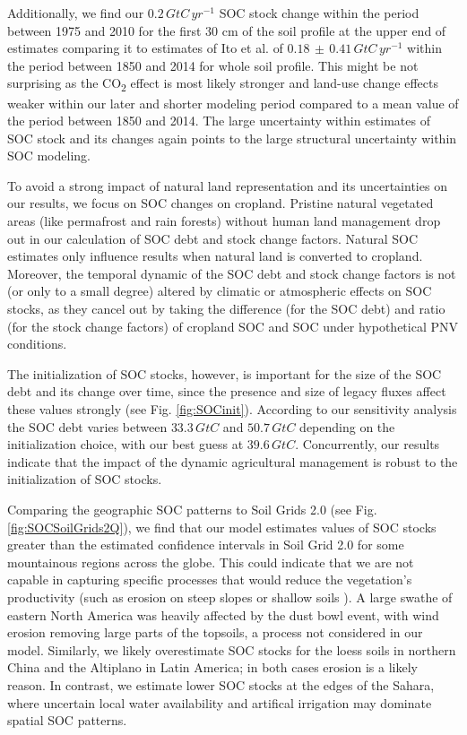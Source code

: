 \documentclass[gc, manuscript]{copernicus}
\begin{document}
Additionally, we find our \(0.2\,\unit{GtC\,yr^{-1}}\) SOC stock change within the period between 1975 and 2010 for the first 30 cm of the soil profile at the upper end of estimates comparing it to estimates of Ito et al. \citeyearpar{ito_soil_2020} of \(0.18\,\pm\,0.41\,\unit{GtC\,yr^{-1}}\) within the period between 1850 and 2014 for whole soil profile. This might be not surprising as the CO\textsubscript{2} effect is most likely stronger and land-use change effects weaker within our later and shorter modeling period compared to a mean value of the period between 1850 and 2014.
The large uncertainty within estimates of SOC stock and its changes \citep{ito_soil_2020} again points to the large structural uncertainty within SOC modeling.

To avoid a strong impact of natural land representation and its uncertainties on our results, we focus on SOC changes on cropland. Pristine natural vegetated areas (like permafrost and rain forests) without human land management drop out in our calculation of SOC debt and stock change factors. Natural SOC estimates only influence results when natural land is converted to cropland. Moreover, the temporal dynamic of the SOC debt and stock change factors is not (or only to a small degree) altered by climatic or atmospheric effects on SOC stocks, as they cancel out by taking the difference (for the SOC debt) and ratio (for the stock change factors) of cropland SOC and SOC under hypothetical PNV conditions.

The initialization of SOC stocks, however, is important for the size of the SOC debt and its change over time, since the presence and size of legacy fluxes affect these values strongly (see Fig. \ref{fig:SOCinit}). According to our sensitivity analysis the SOC debt varies between \(33.3\,\unit{GtC}\) and \(50.7\,\unit{GtC}\) depending on the initialization choice, with our best guess at \(39.6\,\unit{GtC}\). Concurrently, our results indicate that the impact of the dynamic agricultural management is robust to the initialization of SOC stocks.

Comparing the geographic SOC patterns to Soil Grids 2.0 \citep{poggio_soilgrids_2021} (see Fig. \ref{fig:SOCSoilGrids2Q}), we find that our model estimates values of SOC stocks greater than the estimated confidence intervals in Soil Grid 2.0 for some mountainous regions across the globe. This could indicate that we are not capable in capturing specific processes that would reduce the vegetation's productivity (such as erosion on steep slopes or shallow soils \citep{borrelli_assessment_2017}). A large swathe of eastern North America was heavily affected by the dust bowl event, with wind erosion removing large parts of the topsoils, a process not considered in our model. Similarly, we likely overestimate SOC stocks for the loess soils in northern China and the Altiplano in Latin America; in both cases erosion is a likely reason. In contrast, we estimate lower SOC stocks at the edges of the Sahara, where uncertain local water availability and artifical irrigation may dominate spatial SOC patterns.
\end{document}
